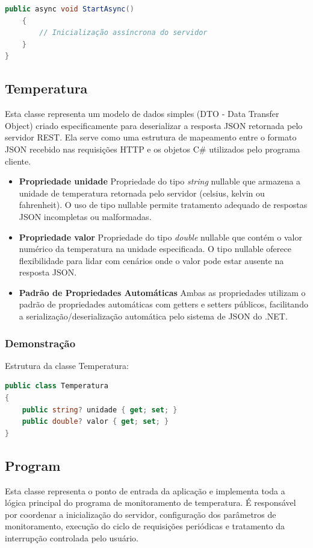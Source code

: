 \documentclass[
	12pt,				%
	oneside,			%
	a4paper,			%
	english,			%
	brazil,				%
	]{abntex2}
\begin{document}
{\begin{lstlisting}[language=csharp]
    public async void StartAsync()
    {
        // Inicialização assíncrona do servidor
    }
}
\end{lstlisting}

\subsection{Temperatura}
Esta classe representa um modelo de dados simples (DTO - Data Transfer Object) criado especificamente para deserializar a resposta JSON retornada pelo servidor REST. Ela serve como uma estrutura de mapeamento entre o formato JSON recebido nas requisições HTTP e os objetos C# utilizados pelo programa cliente.

\begin{itemize}
    \item \textbf{Propriedade unidade}
    Propriedade do tipo \textit{string} nullable que armazena a unidade de temperatura retornada pelo servidor (celsius, kelvin ou fahrenheit). O uso de tipo nullable permite tratamento adequado de respostas JSON incompletas ou malformadas.
    
    \item \textbf{Propriedade valor}
    Propriedade do tipo \textit{double} nullable que contém o valor numérico da temperatura na unidade especificada. O tipo nullable oferece flexibilidade para lidar com cenários onde o valor pode estar ausente na resposta JSON.
    
    \item \textbf{Padrão de Propriedades Automáticas}
    Ambas as propriedades utilizam o padrão de propriedades automáticas com getters e setters públicos, facilitando a serialização/deserialização automática pelo sistema de JSON do .NET.
\end{itemize}

\subsubsection{Demonstração}
Estrutura da classe Temperatura:
\begin{lstlisting}[language=csharp]
public class Temperatura
{
    public string? unidade { get; set; }
    public double? valor { get; set; }
}
\end{lstlisting}

\subsection{Program}
Esta classe representa o ponto de entrada da aplicação e implementa toda a lógica principal do programa de monitoramento de temperatura. É responsável por coordenar a inicialização do servidor, configuração dos parâmetros de monitoramento, execução do ciclo de requisições periódicas e tratamento da interrupção controlada pelo usuário.

}
\end{document}
